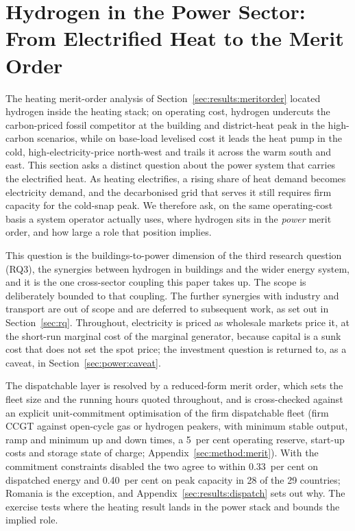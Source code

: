 \section{Hydrogen in the Power Sector: From Electrified Heat to the Merit Order}
\label{sec:power}

The heating merit-order analysis of Section~\ref{sec:results:meritorder} located hydrogen inside
the heating stack; on operating cost, hydrogen undercuts the carbon-priced fossil competitor at
the building and district-heat peak in the high-carbon scenarios, while on base-load levelised
cost it leads the heat pump in the cold, high-electricity-price north-west and trails it across
the warm south and east. This section asks a distinct question about the power system that carries the
electrified heat. As heating electrifies, a rising share of heat demand becomes electricity demand,
and the decarbonised grid that serves it still requires firm capacity for the cold-snap peak. We
therefore ask, on the same operating-cost basis a system operator actually uses, where hydrogen
sits in the \emph{power} merit order, and how large a role that position implies.

This question is the buildings-to-power dimension of the third research question (RQ3),
the synergies between hydrogen in buildings and the wider energy system, and it is the
one cross-sector coupling this paper takes up. The scope is deliberately bounded to that
coupling. The further synergies with industry and transport are out of scope and are
deferred to subsequent work, as set out in Section~\ref{sec:rq}. Throughout, electricity
is priced as wholesale markets price it, at the short-run marginal cost of the marginal
generator, because capital is a sunk cost that does not set the spot price; the
investment question is returned to, as a caveat, in Section~\ref{sec:power:caveat}.

The dispatchable layer is resolved by a reduced-form merit order, which sets the fleet
size and the running hours quoted throughout, and is cross-checked against an explicit
unit-commitment optimisation of the firm dispatchable fleet (firm CCGT against
open-cycle gas or hydrogen peakers, with minimum stable output, ramp and minimum up and
down times, a 5~per cent operating reserve, start-up costs and storage state of charge;
Appendix~\ref{sec:method:merit}). With the commitment constraints disabled the two agree
to within 0.33~per cent on dispatched energy and 0.40~per cent on peak capacity in 28 of
the 29 countries; Romania is the exception, and
Appendix~\ref{sec:results:dispatch} sets out why. The exercise tests where
the heating result lands in the power stack and bounds the implied role.

